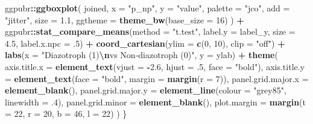 \documentclass[
]{article}
\newenvironment{Shaded}{\begin{snugshade}}{\end{snugshade}}
\newcommand{\AttributeTok}[1]{\textcolor[rgb]{0.13,0.29,0.53}{#1}}
\newcommand{\DecValTok}[1]{\textcolor[rgb]{0.00,0.00,0.81}{#1}}
\newcommand{\FloatTok}[1]{\textcolor[rgb]{0.00,0.00,0.81}{#1}}
\newcommand{\FunctionTok}[1]{\textcolor[rgb]{0.13,0.29,0.53}{\textbf{#1}}}
\newcommand{\NormalTok}[1]{#1}
\newcommand{\SpecialCharTok}[1]{\textcolor[rgb]{0.81,0.36,0.00}{\textbf{#1}}}
\newcommand{\StringTok}[1]{\textcolor[rgb]{0.31,0.60,0.02}{#1}}
\begin{document}
\begin{Shaded}
\begin{Highlighting}[]
\NormalTok{  ggpubr}\SpecialCharTok{::}\FunctionTok{ggboxplot}\NormalTok{(}
\NormalTok{    joined, }\AttributeTok{x =} \StringTok{"p\_np"}\NormalTok{, }\AttributeTok{y =} \StringTok{"value"}\NormalTok{,}
    \AttributeTok{palette =} \StringTok{"jco"}\NormalTok{, }\AttributeTok{add =} \StringTok{"jitter"}\NormalTok{,}
    \AttributeTok{size =} \FloatTok{1.1}\NormalTok{, }\AttributeTok{ggtheme =} \FunctionTok{theme\_bw}\NormalTok{(}\AttributeTok{base\_size =} \DecValTok{16}\NormalTok{)}
\NormalTok{  ) }\SpecialCharTok{+}
\NormalTok{    ggpubr}\SpecialCharTok{::}\FunctionTok{stat\_compare\_means}\NormalTok{(}\AttributeTok{method  =} \StringTok{"t.test"}\NormalTok{,}
                               \AttributeTok{label.y =}\NormalTok{ label\_y,}
                               \AttributeTok{size    =} \FloatTok{4.5}\NormalTok{,}
                               \AttributeTok{label.x.npc =}\NormalTok{ .}\DecValTok{5}\NormalTok{) }\SpecialCharTok{+}
    \FunctionTok{coord\_cartesian}\NormalTok{(}\AttributeTok{ylim =} \FunctionTok{c}\NormalTok{(}\DecValTok{0}\NormalTok{, }\DecValTok{10}\NormalTok{), }\AttributeTok{clip =} \StringTok{"off"}\NormalTok{) }\SpecialCharTok{+}
    \FunctionTok{labs}\NormalTok{(}\AttributeTok{x =} \StringTok{"Diazotroph (1)}\SpecialCharTok{\textbackslash{}n}\StringTok{vs Non‑diazotroph (0)"}\NormalTok{,}
         \AttributeTok{y =}\NormalTok{ ylab) }\SpecialCharTok{+}
    \FunctionTok{theme}\NormalTok{(}
      \AttributeTok{axis.title.x =} \FunctionTok{element\_text}\NormalTok{(}\AttributeTok{vjust =} \SpecialCharTok{{-}}\FloatTok{2.6}\NormalTok{, }\AttributeTok{hjust =}\NormalTok{ .}\DecValTok{5}\NormalTok{, }\AttributeTok{face =} \StringTok{"bold"}\NormalTok{),}
      \AttributeTok{axis.title.y =} \FunctionTok{element\_text}\NormalTok{(}\AttributeTok{face =} \StringTok{"bold"}\NormalTok{,}
                                  \AttributeTok{margin =} \FunctionTok{margin}\NormalTok{(}\AttributeTok{r =} \DecValTok{7}\NormalTok{)),}
      \AttributeTok{panel.grid.major.x =} \FunctionTok{element\_blank}\NormalTok{(),}
      \AttributeTok{panel.grid.major.y =} \FunctionTok{element\_line}\NormalTok{(}\AttributeTok{colour =} \StringTok{"grey85"}\NormalTok{, }\AttributeTok{linewidth =}\NormalTok{ .}\DecValTok{4}\NormalTok{),}
      \AttributeTok{panel.grid.minor   =} \FunctionTok{element\_blank}\NormalTok{(),}
      \AttributeTok{plot.margin        =} \FunctionTok{margin}\NormalTok{(}\AttributeTok{t =} \DecValTok{22}\NormalTok{, }\AttributeTok{r =} \DecValTok{20}\NormalTok{, }\AttributeTok{b =} \DecValTok{46}\NormalTok{, }\AttributeTok{l =} \DecValTok{22}\NormalTok{)}
\NormalTok{    )}
\NormalTok{\}}


\end{Highlighting}
\end{Shaded}
\end{document}
